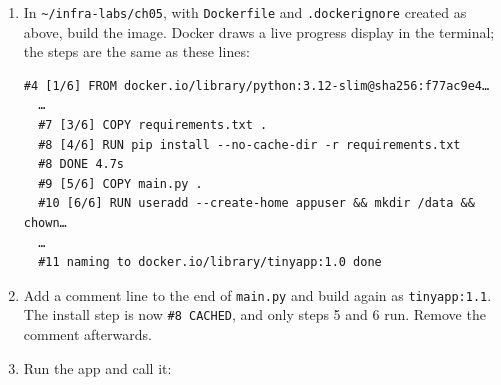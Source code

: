 \begin{enumerate}
\def\labelenumi{\arabic{enumi}.}
\item
  In \texttt{\textasciitilde{}/infra-labs/ch05}, with \texttt{Dockerfile} and \texttt{.dockerignore} created as above, build the image. Docker draws a live progress display in the terminal; the steps are the same as these lines:

  \begin{codeblock}

\begin{Shaded}
\begin{Highlighting}[]
\end{Highlighting}
\end{Shaded}

  \end{codeblock}

  \begin{codeblock}
  \begin{Verbatim}[formatcom=\outputstyle]
  #4 [1/6] FROM docker.io/library/python:3.12-slim@sha256:f77ac9e4…
  …
  #7 [3/6] COPY requirements.txt .
  #8 [4/6] RUN pip install --no-cache-dir -r requirements.txt
  #8 DONE 4.7s
  #9 [5/6] COPY main.py .
  #10 [6/6] RUN useradd --create-home appuser && mkdir /data && chown…
  …
  #11 naming to docker.io/library/tinyapp:1.0 done
  \end{Verbatim}
  \end{codeblock}
\item
  Add a comment line to the end of \texttt{main.py} and build again as \texttt{tinyapp:1.1}. The install step is now \texttt{\#8\ CACHED}, and only steps 5 and 6 run. Remove the comment afterwards.
\item
  Run the app and call it:

  \begin{codeblock}

\begin{Shaded}
\begin{Highlighting}[]
 
\end{Highlighting}
\end{Shaded}


\end{codeblock}
\end{enumerate}
